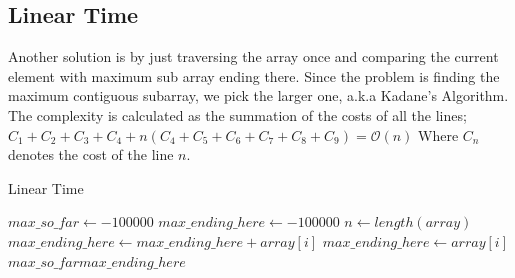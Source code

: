 \documentclass[twocolumns]{IEEEtran}
\begin{document}
\subsection{Linear Time}
Another solution is by just traversing the array once and comparing the current element with maximum sub array ending there. Since the problem is finding the maximum contiguous subarray, we pick the larger one, a.k.a Kadane’s Algorithm.
The complexity is calculated as the summation of the costs of all the lines;
$ C_1 + C_2 +C_3 + C_4 + n(C_4 + C_5 + C_6 + C_7 + C_8 + C_9) = \mathcal{O}(n) $
Where $C_n$ denotes the cost of the line $n$.
\begin{algorithm}
	\caption{Linear Time}
	\begin{algorithmic}[1]
	\State$max\_so\_far \leftarrow -100000$ 
	\State$max\_ending\_here \leftarrow -100000$ 
	\State$n \leftarrow length(array)$ 
		  
			\State$max\_ending\_here \leftarrow max\_ending\_here + array[i]$ 
					\State$max\_ending\_here \leftarrow array[i]$
			\EndIf
			 
				\State$max\_so\_far max\_ending\_here$ 
			\EndIf

		\EndFor
	\end{algorithmic}
\end{algorithm}
\end{document}
